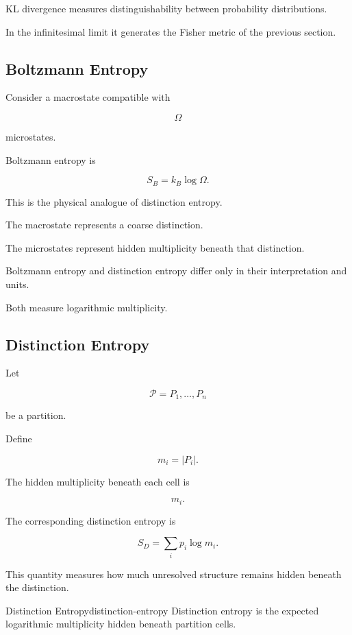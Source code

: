 \documentclass[12pt,twoside,openright]{book}
\newenvironment{rem}
{\begin{remark}{}{}}
{\end{remark}}
\newcommand{\partition}{\mathcal{P}}
\begin{document}
KL divergence measures distinguishability between
probability distributions.

In the infinitesimal limit it generates the Fisher metric
of the previous section.

\subsection{Boltzmann Entropy}

Consider a macrostate compatible with

\[
\Omega
\]

microstates.

Boltzmann entropy is

\[
S_B
=

k_B\log\Omega.
\]

This is the physical analogue of distinction entropy.

The macrostate represents a coarse distinction.

The microstates represent hidden multiplicity beneath that
distinction.

\begin{rem}
Boltzmann entropy and distinction entropy differ only in
their interpretation and units.

Both measure logarithmic multiplicity.
\end{rem}

\subsection{Distinction Entropy}

Let

\[
\partition
=

{P_1,\ldots,P_n}
\]

be a partition.

Define

\[
m_i
=

|P_i|.
\]

The hidden multiplicity beneath each cell is

\[
m_i.
\]

The corresponding distinction entropy is

\[
S_D
=

\sum_i
p_i
\log m_i.
\]

This quantity measures how much unresolved structure
remains hidden beneath the distinction.

\begin{definition}{Distinction Entropy}{distinction-entropy}
Distinction entropy is the expected logarithmic
multiplicity hidden beneath partition cells.
\end{definition}
\end{document}
